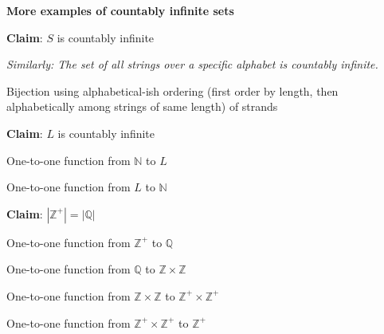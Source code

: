 
{\bf More examples of countably infinite sets}

{\bf Claim}: $S$ is countably infinite

{\it Similarly: The set of all strings over a specific alphabet is countably infinite.}
\begin{center}
Bijection using alphabetical-ish ordering
(first order by length, then alphabetically among strings of same length) 
of strands
\end{center}

\vspace{100pt}


{\bf Claim}: $L$ is countably infinite
\begin{center}
\begin{multicols}{2}
One-to-one function from $\mathbb{N}$ to $L$ 

One-to-one function from $L$ to $\mathbb{N}$
\end{multicols}
\end{center}


\vspace{100pt}

{\bf Claim}: $|\mathbb{Z}^+| = |\mathbb{Q}|$ 

One-to-one function from $\mathbb{Z}^+$ to $\mathbb{Q}$


\vspace{100pt}

\begin{center}
\begin{multicols}{3}
One-to-one function from $\mathbb{Q}$ to $\mathbb{Z} \times \mathbb{Z}$

One-to-one function from $\mathbb{Z} \times \mathbb{Z}$ to $\mathbb{Z}^+ \times \mathbb{Z}^+$

One-to-one function from $\mathbb{Z}^+ \times \mathbb{Z}^+$ to $\mathbb{Z}^+$
\end{multicols}
\end{center}


\vspace{100pt}